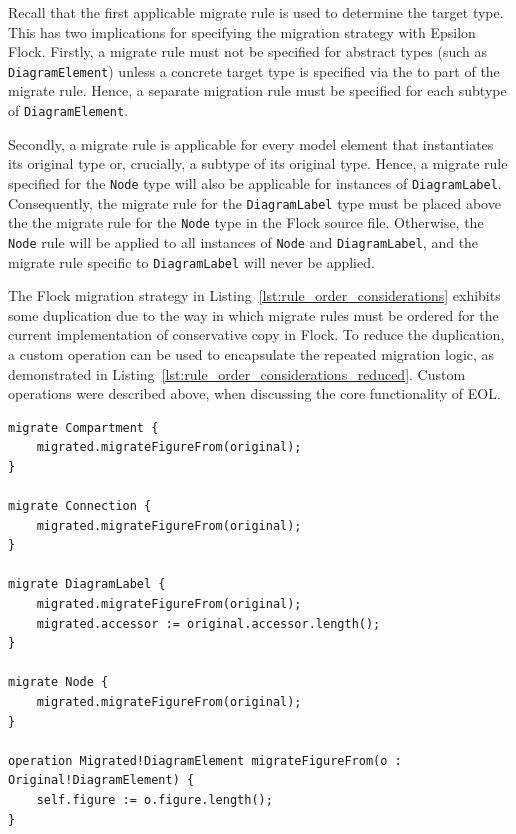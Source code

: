 Recall that the first applicable migrate rule is used to determine the target type. This has two implications for specifying the migration strategy with Epsilon Flock. Firstly, a migrate rule must not be specified for abstract types (such as \texttt{Di\-ag\-r\-amEl\-em\-e\-nt}) unless a concrete target type is specified via the to part of the migrate rule. Hence, a separate migration rule must be specified for each subtype of \texttt{Di\-ag\-r\-amEl\-em\-e\-nt}.

Secondly, a migrate rule is applicable for every model element that instantiates its original type or, crucially, a subtype of its original type. Hence, a migrate rule specified for the \texttt{Node} type will also be applicable for instances of \texttt{Di\-ag\-ra\-mLa\-b\-el}. Consequently, the migrate rule for the \texttt{Di\-ag\-ra\-mLa\-b\-el} type must be placed above the the migrate rule for the \texttt{Node} type in the Flock source file. Otherwise, the \texttt{No\-de} rule will be applied to all instances of \texttt{No\-de} and \texttt{Di\-ag\-ra\-mLa\-b\-el}, and the migrate rule specific to \texttt{Di\-ag\-ra\-mLa\-b\-el} will never be applied.

The Flock migration strategy in Listing~\ref{lst:rule_order_considerations} exhibits some duplication due to the way in which migrate rules must be ordered for the current implementation of conservative copy in Flock. To reduce the duplication, a custom operation can be used to encapsulate the repeated migration logic, as demonstrated in Listing~\ref{lst:rule_order_considerations_reduced}. Custom operations were described above, when discussing the core functionality of EOL.

\begin{lstlisting}[float=tbp, caption=Using a custom operation to reduce duplication in the migration strategy in Listing~\ref{lst:rule_order_considerations}, label=lst:rule_order_considerations_reduced, language=Flock, tabsize=2]
migrate Compartment {
	migrated.migrateFigureFrom(original);
}

migrate Connection {
	migrated.migrateFigureFrom(original);
}

migrate DiagramLabel {
	migrated.migrateFigureFrom(original);
	migrated.accessor := original.accessor.length();
}

migrate Node {
	migrated.migrateFigureFrom(original);
}

operation Migrated!DiagramElement migrateFigureFrom(o : Original!DiagramElement) {
	self.figure := o.figure.length();
}
\end{lstlisting}

